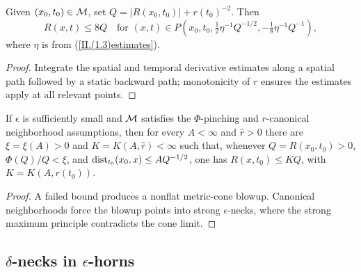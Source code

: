 \begin{lemma}
  \label{lem:kl-curvature-bounds-from-priori-assumptions-estimates-curvature}
\label{claim1II.4.2}
Given $(x_0,t_0)\in{\mathcal M}$, set $Q=|R(x_0,t_0)|+r(t_0)^{-2}$. Then
\[
R(x,t)\leq8Q\quad\text{for }(x,t)\in
P\left(x_0,t_0,\tfrac12\eta^{-1}Q^{-1/2},-\tfrac18\eta^{-1}Q^{-1}\right),
\]
where $\eta$ is from (\ref{II.(1.3)estimates}).
\end{lemma}
\begin{proof}
\sketch Integrate the spatial and temporal derivative estimates along a
spatial path followed by a static backward path; monotonicity of $r$ ensures
the estimates apply at all relevant points.
\end{proof}

\begin{lemma}
  \label{lem:kl-curvature-bounds-from-priori-assumptions-canonical-neighborhoods-lemma}
\label{claim2II.4.2}
If $\epsilon$ is sufficiently small and ${\mathcal M}$ satisfies the $\Phi$-pinching
and $r$-canonical neighborhood assumptions, then for every $A<\infty$ and
$\widehat r>0$ there are $\xi=\xi(A)>0$ and $K=K(A,\widehat r)<\infty$ such
that, whenever $Q=R(x_0,t_0)>0$, $\Phi(Q)/Q<\xi$, and
$\operatorname{dist}_{t_0}(x_0,x)\leq A Q^{-1/2}$, one has
$R(x,t_0)\leq KQ$, with $K=K(A,r(t_0))$.
\end{lemma}
\begin{proof}
\sketch A failed bound produces a nonflat metric-cone blowup. Canonical
neighborhoods force the blowup points into strong $\epsilon$-necks, where the
strong maximum principle contradicts the cone limit.
\end{proof}

\subsection{$\delta$-necks in $\epsilon$-horns}

